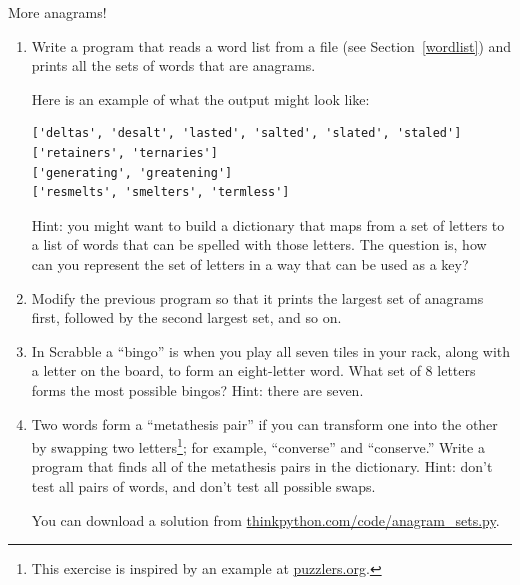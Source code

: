 \documentclass[10pt]{book}
\begin{document}
{\begin{ex}
\end{ex}


\begin{ex}
\label{anagrams}


More anagrams!

\begin{enumerate}

\item Write a program
that reads a word list from a file (see Section~\ref{wordlist}) and
prints all the sets of words that are anagrams.

Here is an example of what the output might look like:

\beforeverb
\begin{verbatim}
['deltas', 'desalt', 'lasted', 'salted', 'slated', 'staled']
['retainers', 'ternaries']
['generating', 'greatening']
['resmelts', 'smelters', 'termless']
\end{verbatim}
\afterverb
%
Hint: you might want to build a dictionary that maps from a
set of letters to a list of words that can be spelled with those
letters.  The question is, how can you represent the set of
letters in a way that can be used as a key?

\item Modify the previous program so that it prints the largest set
of anagrams first, followed by the second largest set, and so on.


\item In Scrabble a ``bingo'' is when you play all seven tiles in
your rack, along with a letter on the board, to form an eight-letter
word.  What set of 8 letters forms the most possible bingos?
Hint: there are seven.



\item Two words form a ``metathesis pair'' if you can transform one
  into the other by swapping two letters\footnote{This exercise is
    inspired by an example at \url{puzzlers.org}.}; for example,
  ``converse'' and ``conserve.''  Write a program that finds all of
  the metathesis pairs in the dictionary.  Hint: don't test all pairs
  of words, and don't test all possible swaps.

You can download a solution from \url{thinkpython.com/code/anagram_sets.py}.


\end{enumerate}
\end{ex}}
\end{document}
